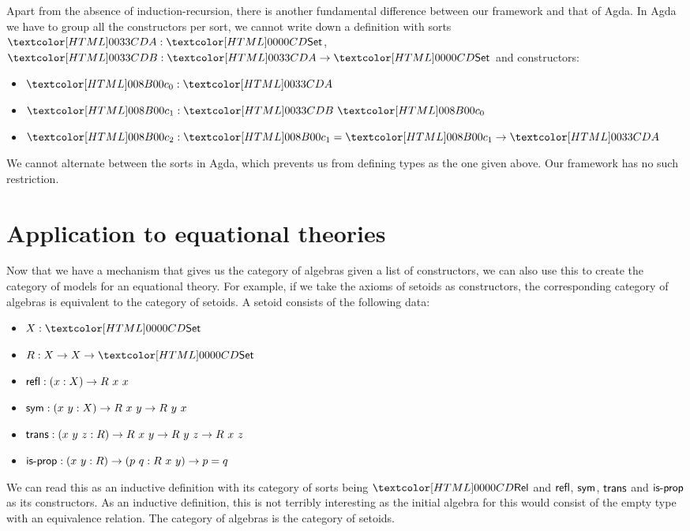 Apart from the absence of induction-recursion, there is another
fundamental difference between our framework and that of Agda. In Agda
we have to group all the constructors per sort, \ie we cannot write
down a definition with sorts $\Aty : \Set$, $\Bty : \Aty \to \Set$ and
constructors:
%
\begin{itemize}
\item $\Aco : \Aty$
\item $\Bci : \Bty\ \Aco$
\item $\Acii : \Bci = \Bci \to \Aty$
\end{itemize}
%
We cannot alternate between the sorts in Agda, which prevents us from
defining types as the one given above. Our framework has no such
restriction.

\section{Application to equational theories}
\label{application-to-equational-theories}

Now that we have a mechanism that gives us the category of algebras
given a list of constructors, we can also use this to create the
category of models for an equational theory. For example, if we take
the axioms of setoids as constructors, the corresponding category of
algebras is equivalent to the category of setoids. A setoid consists
of the following data:
\begin{itemize}
\item $X : \Set$
\item $R : X \to X \to \Set$
\item $\ident{refl} : (x : X) \to R\ x\ x$
\item $\ident{sym} : (x\ y : X) \to R\ x\ y \to R\ y\ x$
\item $\ident{trans} : (x\ y\ z : R) \to R\ x\ y \to R\ y\ z \to R\ x\ z$
\item $\ident{is-prop} : (x\ y : R) \to (p\ q : R\ x\ y) \to p = q$
\end{itemize}
We can read this as an inductive definition with its category of sorts
being $\Rel$ and $\ident{refl}$, $\ident{sym}$, $\ident{trans}$ and
$\ident{is-prop}$ as its constructors. As an inductive definition,
this is not terribly interesting as the initial algebra for this would
consist of the empty type with an equivalence relation. The category
of algebras is the category of setoids.
